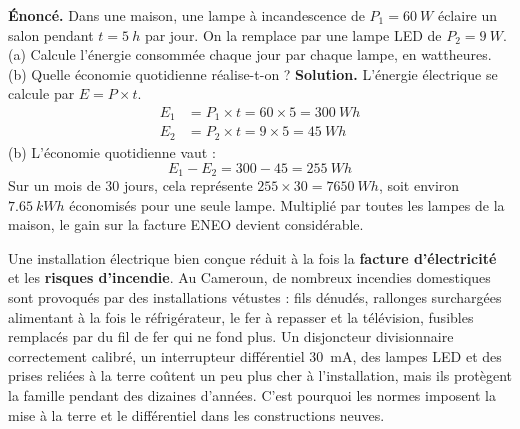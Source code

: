 \documentclass[11pt]{article}
\begin{document}
\begin{exoresolu}
\textbf{Énoncé.} Dans une maison, une lampe à incandescence de $P_1 = \SI{60}{W}$ éclaire un salon pendant $t = \SI{5}{h}$ par jour. On la remplace par une lampe LED de $P_2 = \SI{9}{W}$. (a) Calcule l'énergie consommée chaque jour par chaque lampe, en wattheures. (b) Quelle économie quotidienne réalise-t-on ?
\tcblower
\textbf{Solution.} L'énergie électrique se calcule par $E = P \times t$.
\begin{align*}
E_1 &= P_1 \times t = 60 \times 5 = \SI{300}{Wh} \\
E_2 &= P_2 \times t = 9 \times 5 = \SI{45}{Wh}
\end{align*}
(b) L'économie quotidienne vaut :
\[ E_1 - E_2 = 300 - 45 = \SI{255}{Wh} \]
Sur un mois de 30 jours, cela représente $255 \times 30 = \SI{7650}{Wh}$, soit environ $\SI{7.65}{kWh}$ économisés pour une seule lampe. Multiplié par toutes les lampes de la maison, le gain sur la facture ENEO devient considérable.
\end{exoresolu}

\begin{savaistu}
Une installation électrique bien conçue réduit à la fois la \textbf{facture d'électricité} et les \textbf{risques d'incendie}. Au Cameroun, de nombreux incendies domestiques sont provoqués par des installations vétustes : fils dénudés, rallonges surchargées alimentant à la fois le réfrigérateur, le fer à repasser et la télévision, fusibles remplacés par du fil de fer qui ne fond plus. Un disjoncteur divisionnaire correctement calibré, un interrupteur différentiel \SI{30}{mA}, des lampes LED et des prises reliées à la terre coûtent un peu plus cher à l'installation, mais ils protègent la famille pendant des dizaines d'années. C'est pourquoi les normes imposent la mise à la terre et le différentiel dans les constructions neuves.
\end{savaistu}
\end{document}
